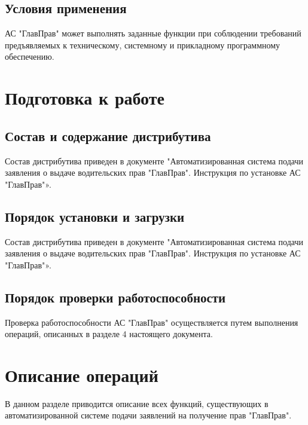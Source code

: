 \documentclass[russian, utf8, 12pt,pointsubsection,floatsubsection]{eskdtext}
\begin{document}
\subsection{Условия применения}
АС "ГлавПрав" может выполнять заданные функции при соблюдении требований предъявляемых к техническому, системному и прикладному программному обеспечению.

\section{Подготовка к работе}

\subsection{Состав и содержание дистрибутива}
Состав дистрибутива приведен в документе "Автоматизированная система подачи заявления о выдаче водительских прав "ГлавПрав". Инструкция по установке АС "ГлавПрав"».

\subsection{Порядок установки и загрузки}
Состав дистрибутива приведен в документе "Автоматизированная система подачи заявления о выдаче водительских прав "ГлавПрав". Инструкция по установке АС "ГлавПрав"».

\subsection{Порядок проверки работоспособности}
Проверка работоспособности АС "ГлавПрав" осуществляется путем выполнения операций, описанных в разделе 4 настоящего документа.

\section{Описание операций}
В данном разделе приводится описание всех функций, существующих в автоматизированной системе подачи заявлений на получение прав "ГлавПрав".
\end{document}
